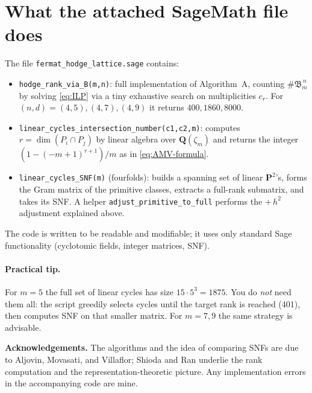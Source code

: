 \documentclass[11pt]{article}
\theoremstyle{definition}
\newcommand{\PP}{\mathbf{P}}
\newcommand{\QQ}{\mathbf{Q}}
\begin{document}
\section{What the attached \textsf{SageMath} file does}
The file \texttt{fermat\_hodge\_lattice.sage} contains:
\begin{itemize}
\item \texttt{hodge\_rank\_via\_B(m,n)}: full implementation of Algorithm~A, counting \(\#\mathfrak B_m^{\,n}\) by solving \eqref{eq:ILP} via a tiny exhaustive search on multiplicities \(c_r\). For $(n,d)=(4,5),(4,7),(4,9)$ it returns \(400,1860,8000\).
\item \texttt{linear\_cycles\_intersection\_number(c1,c2,m)}: computes \(r=\dim(P_i\cap P_j)\) by linear algebra over \(\QQ(\zeta_m)\) and returns the integer \( (1-(-m+1)^{r+1})/m\) as in \eqref{eq:AMV-formula}.
\item \texttt{linear\_cycles\_SNF(m)} (fourfolds): builds a spanning set of linear \(\PP^2\)'s, forms the Gram matrix of the primitive classes, extracts a full-rank submatrix, and takes its SNF. A helper \texttt{adjust\_primitive\_to\_full} performs the \(+\,h^2\) adjustment explained above.
\end{itemize}
The code is written to be readable and modifiable; it uses only standard \textsf{Sage} functionality (cyclotomic fields, integer matrices, SNF).

\paragraph{Practical tip.} For \(m=5\) the full set of linear cycles has size \(15\cdot 5^3=1875\). You do \emph{not} need them all: the script greedily selects cycles until the target rank is reached (401), then computes SNF on that smaller matrix. For \(m=7,9\) the same strategy is advisable.

\bigskip
\noindent\textbf{Acknowledgements.} The algorithms and the idea of comparing SNFs are due to Aljovin, Movasati, and Villaflor; Shioda and Ran underlie the rank computation and the representation-theoretic picture. Any implementation errors in the accompanying code are mine.
\end{document}
